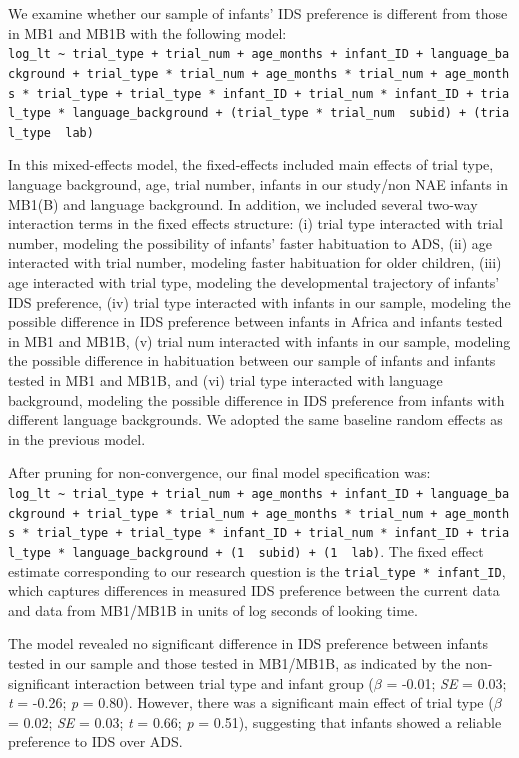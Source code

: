 \documentclass[
  ,man,floatsintext]{apa6}
\begin{document}
We examine whether our sample of infants' IDS preference is different from those in MB1 and MB1B with the following model:
\texttt{log\_lt\ \textasciitilde{}\ trial\_type\ +\ trial\_num\ +\ age\_months\ +\ infant\_ID\ +\ language\_background\ +\ trial\_type\ *\ trial\_num\ +\ age\_months\ *\ trial\_num\ +\ age\_months\ *\ trial\_type\ +\ trial\_type\ *\ infant\_ID\ +\ trial\_num\ *\ infant\_ID\ +\ trial\_type\ *\ language\_background\ +\ (trial\_type\ *\ trial\_num\ \textbar{}\ subid)\ +\ (trial\_type\ \textbar{}\ lab)}

In this mixed-effects model, the fixed-effects included main effects of trial type, language background, age, trial number, infants in our study/non NAE infants in MB1(B) and language background. In addition, we included several two-way interaction terms in the fixed effects structure: (i) trial type interacted with trial number, modeling the possibility of infants' faster habituation to ADS, (ii) age interacted with trial number, modeling faster habituation for older children, (iii) age interacted with trial type, modeling the developmental trajectory of infants' IDS preference, (iv) trial type interacted with infants in our sample, modeling the possible difference in IDS preference between infants in Africa and infants tested in MB1 and MB1B, (v) trial num interacted with infants in our sample, modeling the possible difference in habituation between our sample of infants and infants tested in MB1 and MB1B, and (vi) trial type interacted with language background, modeling the possible difference in IDS preference from infants with different language backgrounds. We adopted the same baseline random effects as in the previous model.

After pruning for non-convergence, our final model specification was: \texttt{log\_lt\ \textasciitilde{}\ trial\_type\ +\ trial\_num\ +\ age\_months\ +\ infant\_ID\ +\ language\_background\ +\ trial\_type\ *\ trial\_num\ +\ age\_months\ *\ trial\_num\ +\ age\_months\ *\ trial\_type\ +\ trial\_type\ *\ infant\_ID\ +\ trial\_num\ *\ infant\_ID\ +\ trial\_type\ *\ language\_background\ +\ (1\ \textbar{}\ subid)\ +\ (1\ \textbar{}\ lab)}. The fixed effect estimate corresponding to our research question is the \texttt{trial\_type\ *\ infant\_ID}, which captures differences in measured IDS preference between the current data and data from MB1/MB1B in units of log seconds of looking time.

The model revealed no significant difference in IDS preference between infants tested in our sample and those tested in MB1/MB1B, as indicated by the non-significant interaction between trial type and infant group (\emph{\(\beta\)} = -0.01; \emph{SE} = 0.03; \emph{t} = -0.26; \emph{p} = 0.80). However, there was a significant main effect of trial type (\emph{\(\beta\)} = 0.02; \emph{SE} = 0.03; \emph{t} = 0.66; \emph{p} = 0.51), suggesting that infants showed a reliable preference to IDS over ADS.
\end{document}
